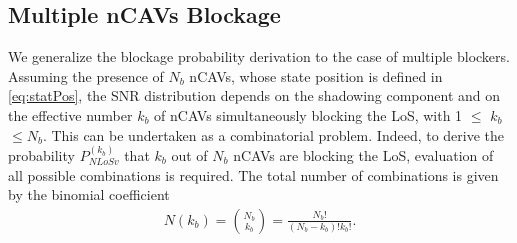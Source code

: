 \documentclass[journal]{IEEEtran}
\begin{document}
\subsection{Multiple nCAVs Blockage}
We generalize the blockage probability derivation to the case of multiple blockers.
Assuming the presence of $N_b$ nCAVs, whose state position is defined in \eqref{eq:statPos}, the SNR distribution depends on the shadowing component and on the effective number $k_b$ of nCAVs simultaneously blocking the LoS, with 1 $\leq$ $k_b$ $\leq N_b$. This can be undertaken as a combinatorial problem. Indeed, to derive the probability $P_{NLoSv}^{(k_b)}$ that $k_b$ out of $N_b$ nCAVs are blocking the LoS, evaluation of all possible combinations is required.
The total number of combinations is given by the binomial coefficient
\begin{align}
    N{(k_b)} = \binom{N_b}{k_b}  = \frac{N_b!}{(N_b-k_b)! k_b!}.
\end{align}
\end{document}
